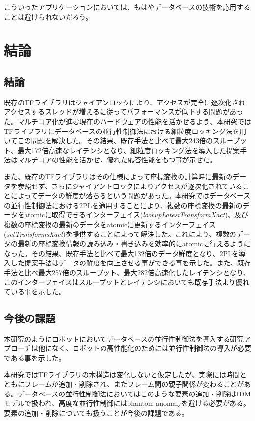 \documentclass[a4paper]{jreport}	%
\begin{document}
こういったアプリケーションにおいては、もはやデータベースの技術を応用することは避けられないだろう。


\chapter{結論}
\section{結論}
既存のTFライブラリはジャイアンロックにより、アクセスが完全に逐次化されアクセスするスレッドが増えるに従ってパフォーマンスが低下する問題があった。マルチコア化が進む現在のハードウェアの性能を活かせるよう、本研究ではTFライブラリにデータベースの並行性制御法における細粒度ロッキング法を用いてこの問題を解決した。その結果、既存手法と比べて最大243倍のスループット、最大172倍高速なレイテンシとなり、細粒度ロッキング法を導入した提案手法はマルチコアの性能を活かせ、優れた応答性能をもつ事が示せた。


また、既存のTFライブラリはその仕様によって座標変換の計算時に最新のデータを参照せず、さらにジャイアントロックによりアクセスが逐次化されていることによってデータの鮮度が落ちるという問題があった。本研究ではデータベースの並行性制御法における2PLを適用することにより、複数の座標変換の最新のデータをatomicに取得できるインターフェイス(\textit{lookupLatestTransformXact})、及び複数の座標変換の最新のデータをatomicに更新するインターフェイス(\textit{setTransformsXact})を提供することによって解決した。これにより、複数のデータの最新の座標変換情報の読み込み・書き込みを効率的にatomicに行えるようになった。その結果、既存手法と比べて最大132倍のデータ鮮度となり、2PLを導入した提案手法はデータの鮮度を向上させる事ができる事を示した。また、既存手法と比べ最大257倍のスループット、最大282倍高速化したレイテンシとなり、このインターフェイスはスループットとレイテンシにおいても既存手法より優れている事を示した。

\section{今後の課題}
本研究のようにロボットにおいてデータベースの並行性制御法を導入する研究アプローチは他になく、ロボットの高性能化のためには並行性制御法の導入が必要である事を示した。

本研究ではTFライブラリの木構造は変化しないと仮定したが、実際には時間とともにフレームが追加・削除され、またフレーム間の親子関係が変わることがある。データベースの並行性制御法においてはこのような要素の追加・削除はIDMモデルで扱われ、高度な並行性制御にはphantom anomalyを避ける必要がある。要素の追加・削除についても扱うことが今後の課題である。
\end{document}

